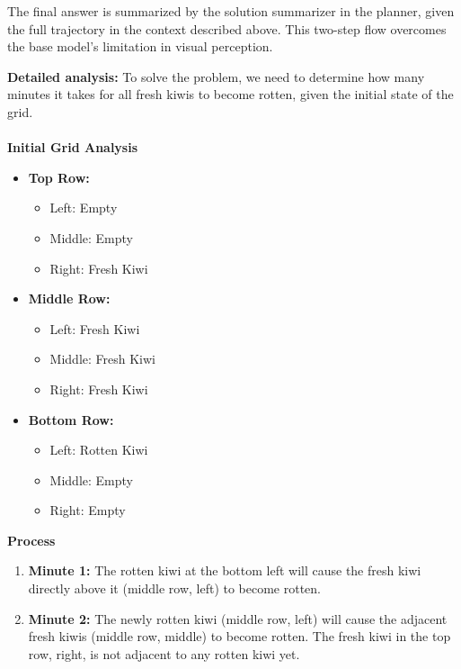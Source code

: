 
The final answer is summarized by the solution summarizer in the planner, given the full trajectory in the context described above. This two-step flow overcomes the base \gpt model’s limitation in visual perception.

\begin{answerbox}

\textbf{Detailed analysis:}
To solve the problem, we need to determine how many minutes it takes for all fresh kiwis to become rotten, given the initial state of the grid.
\\\\
\textbf{Initial Grid Analysis}
\begin{itemize}
    \item \textbf{Top Row:} 
    \begin{itemize}
        \item Left: Empty
        \item Middle: Empty
        \item Right: Fresh Kiwi
    \end{itemize}

    \item \textbf{Middle Row:}
    \begin{itemize}
        \item Left: Fresh Kiwi
        \item Middle: Fresh Kiwi
        \item Right: Fresh Kiwi
    \end{itemize}

    \item \textbf{Bottom Row:}
    \begin{itemize}
        \item Left: Rotten Kiwi
        \item Middle: Empty
        \item Right: Empty
    \end{itemize}
\end{itemize}

\textbf{Process}
\begin{enumerate}
    \item \textbf{Minute 1:}  
    The rotten kiwi at the bottom left will cause the fresh kiwi directly above it (middle row, left) to become rotten.

    \item \textbf{Minute 2:}  
    The newly rotten kiwi (middle row, left) will cause the adjacent fresh kiwis (middle row, middle) to become rotten.  
    The fresh kiwi in the top row, right, is not adjacent to any rotten kiwi yet.


\end{enumerate}
\end{answerbox}
